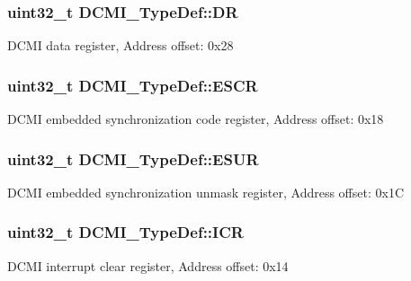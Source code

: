 \subsubsection[{\texorpdfstring{DR}{DR}}]{ uint32\+\_\+t D\+C\+M\+I\+\_\+\+Type\+Def\+::\+DR}\hypertarget{struct_d_c_m_i___type_def_a266cec1031b0be730b0e35523f5e2934}{}\label{struct_d_c_m_i___type_def_a266cec1031b0be730b0e35523f5e2934}
D\+C\+MI data register, Address offset\+: 0x28 
\subsubsection[{\texorpdfstring{E\+S\+CR}{ESCR}}]{ uint32\+\_\+t D\+C\+M\+I\+\_\+\+Type\+Def\+::\+E\+S\+CR}\hypertarget{struct_d_c_m_i___type_def_a52c16b920a3f25fda961d0cd29749433}{}\label{struct_d_c_m_i___type_def_a52c16b920a3f25fda961d0cd29749433}
D\+C\+MI embedded synchronization code register, Address offset\+: 0x18 
\subsubsection[{\texorpdfstring{E\+S\+UR}{ESUR}}]{ uint32\+\_\+t D\+C\+M\+I\+\_\+\+Type\+Def\+::\+E\+S\+UR}\hypertarget{struct_d_c_m_i___type_def_af00a94620e33f4eff74430ff25c12b94}{}\label{struct_d_c_m_i___type_def_af00a94620e33f4eff74430ff25c12b94}
D\+C\+MI embedded synchronization unmask register, Address offset\+: 0x1C 
\subsubsection[{\texorpdfstring{I\+CR}{ICR}}]{ uint32\+\_\+t D\+C\+M\+I\+\_\+\+Type\+Def\+::\+I\+CR}\hypertarget{struct_d_c_m_i___type_def_a0371fc07916e3043e1151eaa97e172c9}{}\label{struct_d_c_m_i___type_def_a0371fc07916e3043e1151eaa97e172c9}
D\+C\+MI interrupt clear register, Address offset\+: 0x14 
